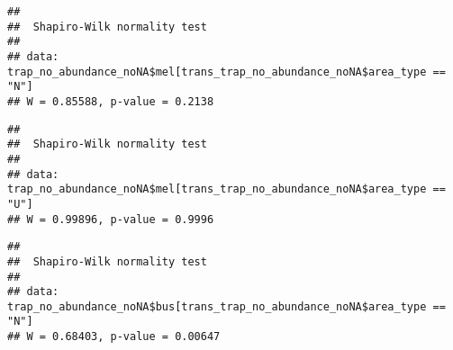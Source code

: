 \documentclass[
]{article}
\newenvironment{Shaded}{\begin{snugshade}}{\end{snugshade}}
\newcommand{\FunctionTok}[1]{\textcolor[rgb]{0.13,0.29,0.53}{\textbf{#1}}}
\newcommand{\NormalTok}[1]{#1}
\newcommand{\SpecialCharTok}[1]{\textcolor[rgb]{0.81,0.36,0.00}{\textbf{#1}}}
\newcommand{\StringTok}[1]{\textcolor[rgb]{0.31,0.60,0.02}{#1}}
\begin{document}
\begin{Shaded}
\end{Shaded}

\begin{verbatim}
## 
##  Shapiro-Wilk normality test
## 
## data:  trap_no_abundance_noNA$mel[trans_trap_no_abundance_noNA$area_type == "N"]
## W = 0.85588, p-value = 0.2138
\end{verbatim}

\begin{Shaded}
\end{Shaded}

\begin{verbatim}
## 
##  Shapiro-Wilk normality test
## 
## data:  trap_no_abundance_noNA$mel[trans_trap_no_abundance_noNA$area_type == "U"]
## W = 0.99896, p-value = 0.9996
\end{verbatim}

\begin{Shaded}
\end{Shaded}

\begin{verbatim}
## 
##  Shapiro-Wilk normality test
## 
## data:  trap_no_abundance_noNA$bus[trans_trap_no_abundance_noNA$area_type == "N"]
## W = 0.68403, p-value = 0.00647
\end{verbatim}

\begin{Shaded}
\end{Shaded}
\end{document}
